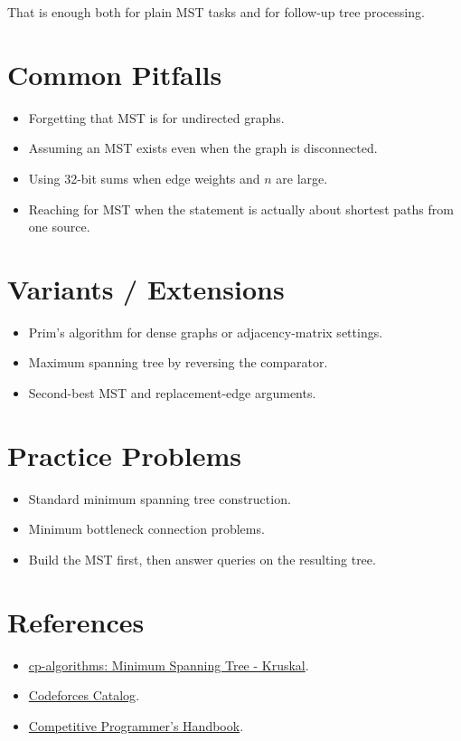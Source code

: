 That is enough both for plain MST tasks and for follow-up tree processing.

\section*{Common Pitfalls}

\begin{itemize}
  \item Forgetting that MST is for undirected graphs.
  \item Assuming an MST exists even when the graph is disconnected.
  \item Using 32-bit sums when edge weights and \(n\) are large.
  \item Reaching for MST when the statement is actually about shortest paths from one source.
\end{itemize}

\section*{Variants / Extensions}

\begin{itemize}
  \item Prim's algorithm for dense graphs or adjacency-matrix settings.
  \item Maximum spanning tree by reversing the comparator.
  \item Second-best MST and replacement-edge arguments.
\end{itemize}

\section*{Practice Problems}

\begin{itemize}
  \item Standard minimum spanning tree construction.
  \item Minimum bottleneck connection problems.
  \item Build the MST first, then answer queries on the resulting tree.
\end{itemize}

\section*{References}

\begin{itemize}
  \item \href{https://cp-algorithms.com/graph/mst_kruskal.html}{cp-algorithms: Minimum Spanning Tree - Kruskal}.
  \item \href{https://codeforces.com/catalog?locale=en}{Codeforces Catalog}.
  \item \href{https://usaco.guide/CPH.pdf}{Competitive Programmer's Handbook}.
\end{itemize}

